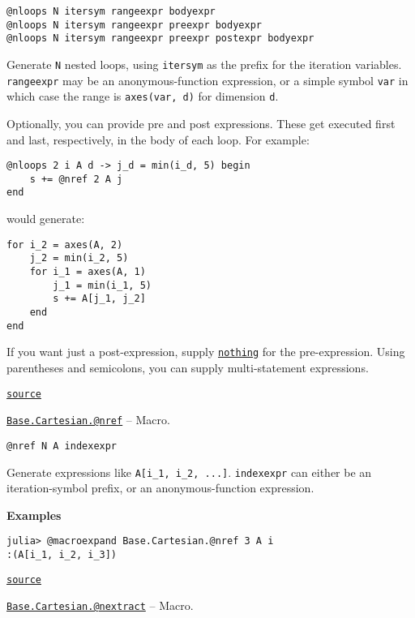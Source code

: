 \begin{adjustwidth}{2em}{0pt}


\begin{verbatim}
@nloops N itersym rangeexpr bodyexpr
@nloops N itersym rangeexpr preexpr bodyexpr
@nloops N itersym rangeexpr preexpr postexpr bodyexpr
\end{verbatim}

Generate \texttt{N} nested loops, using \texttt{itersym} as the prefix for the iteration variables. \texttt{rangeexpr} may be an anonymous-function expression, or a simple symbol \texttt{var} in which case the range is \texttt{axes(var, d)} for dimension \texttt{d}.

Optionally, you can provide {\textquotedbl}pre{\textquotedbl} and {\textquotedbl}post{\textquotedbl} expressions. These get executed first and last, respectively, in the body of each loop. For example:


\begin{lstlisting}
@nloops 2 i A d -> j_d = min(i_d, 5) begin
    s += @nref 2 A j
end
\end{lstlisting}

would generate:


\begin{lstlisting}
for i_2 = axes(A, 2)
    j_2 = min(i_2, 5)
    for i_1 = axes(A, 1)
        j_1 = min(i_1, 5)
        s += A[j_1, j_2]
    end
end
\end{lstlisting}

If you want just a post-expression, supply \hyperlink{9331422207248206047}{\texttt{nothing}} for the pre-expression. Using parentheses and semicolons, you can supply multi-statement expressions.



\href{https://github.com/JuliaLang/julia/blob/44fa15b1502a45eac76c9017af94332d4557b251/base/cartesian.jl#L9-L37}{\texttt{source}}


\end{adjustwidth}
\hypertarget{5318613607184308860}{} 
\hyperlink{5318613607184308860}{\texttt{Base.Cartesian.@nref}}  -- {Macro.}

\begin{adjustwidth}{2em}{0pt}


\begin{verbatim}
@nref N A indexexpr
\end{verbatim}

Generate expressions like \texttt{A[i\_1, i\_2, ...]}. \texttt{indexexpr} can either be an iteration-symbol prefix, or an anonymous-function expression.

\textbf{Examples}


\begin{verbatim}
julia> @macroexpand Base.Cartesian.@nref 3 A i
:(A[i_1, i_2, i_3])
\end{verbatim}



\href{https://github.com/JuliaLang/julia/blob/44fa15b1502a45eac76c9017af94332d4557b251/base/cartesian.jl#L72-L83}{\texttt{source}}


\end{adjustwidth}
\hypertarget{5592996802344748158}{} 
\hyperlink{5592996802344748158}{\texttt{Base.Cartesian.@nextract}}  -- {Macro.}

